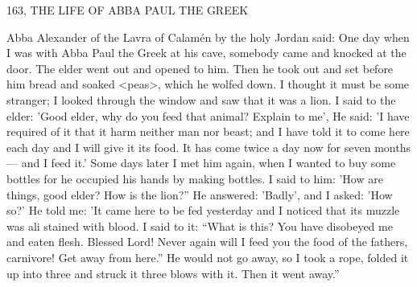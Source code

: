 163, THE LIFE OF ABBA PAUL THE GREEK

Abba Alexander of the Lavra of Calamén by the holy Jordan said:
One day when I was with Abba Paul the Greek at his cave,
somebody came and knocked at the door. The elder went out and
opened to him. Then he took out and set before him bread and
soaked <peas>, which he wolfed down. I thought it must be some
stranger; I looked through the window and saw that it was a lion.
I said to the elder: 'Good elder, why do you feed that animal?
Explain to me', He said: 'I have required of it that it harm neither
man nor beast; and I have told it to come here each day and I will
give it its food. It has come twice a day now for seven months—
and I feed it.' Some days later I met him again, when I wanted to
buy some bottles for he occupied his hands by making bottles. I
said to him: 'How are things, good elder? How is the lion?” He
answered: 'Badly', and I asked: 'How so?' He told me: 'It came here
to be fed yesterday and I noticed that its muzzle was ali stained with
blood. I said to it: “What is this? You have disobeyed me and eaten
flesh. Blessed Lord! Never again will I feed you the food of the
fathers, carnivore! Get away from here.” He would not go away, so
I took a rope, folded it up into three and struck it three blows with
it. Then it went away.”


